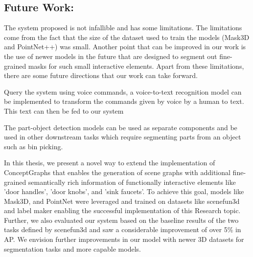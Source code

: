 \subsection{Future Work:}
The system proposed is not infallible and has some limitations. The limitations come from the fact that the size of the dataset used to train the models (Mask3D 
and PointNet++) was small. Another point that can be improved in our work is the use of newer models in the future that are designed to segment out fine-grained masks
for such small interactive elements. Apart from these limitations, there are some future directions that our work can take forward.
\begin{compactenum}[1.]
    \item	Query the system using voice commands, a voice-to-text recognition model can be implemented to transform the commands given by voice by a human to text. This text can then be fed to our system
    \item	The part-object detection models can be used as separate components and be used in other downstream tasks which require segmenting parts from an object such as bin picking.
    \end{compactenum}
In this thesis, we present a novel way to extend the implementation of ConceptGraphs that enables the generation of scene graphs with additional fine-grained 
semantically rich information of functionally interactive elements like 'door handles', 'door knobs', and 'sink faucets'. To achieve this goal, models like Mask3D,
and PointNet were leveraged and trained on datasets like scenefun3d and label maker enabling the successful implementation of this Research topic. Further, we also evaluated 
our system based on the baseline results of the two tasks defined by scenefun3d and saw a considerable improvement of over 5\% in AP. We envision further improvements in
our model with newer 3D datasets for segmentation tasks and more capable models. 

